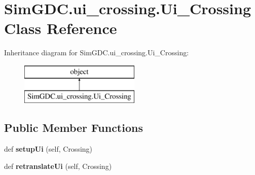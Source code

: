 \hypertarget{class_sim_g_d_c_1_1ui__crossing_1_1_ui___crossing}{}\section{Sim\+G\+D\+C.\+ui\+\_\+crossing.\+Ui\+\_\+\+Crossing Class Reference}
\label{class_sim_g_d_c_1_1ui__crossing_1_1_ui___crossing}
Inheritance diagram for Sim\+G\+D\+C.\+ui\+\_\+crossing.\+Ui\+\_\+\+Crossing\+:\begin{figure}[H]
\begin{center}
\leavevmode
\includegraphics[height=2.000000cm]{class_sim_g_d_c_1_1ui__crossing_1_1_ui___crossing}
\end{center}
\end{figure}
\subsection*{Public Member Functions}
\begin{DoxyCompactItemize}
\item 
\hypertarget{class_sim_g_d_c_1_1ui__crossing_1_1_ui___crossing_afd727a98bc7121d98cd08a546063da6e}{}def {\bfseries setup\+Ui} (self, Crossing)\label{class_sim_g_d_c_1_1ui__crossing_1_1_ui___crossing_afd727a98bc7121d98cd08a546063da6e}

\item 
\hypertarget{class_sim_g_d_c_1_1ui__crossing_1_1_ui___crossing_abe5aad659a739dcfeb3c33af37e51f0b}{}def {\bfseries retranslate\+Ui} (self, Crossing)\label{class_sim_g_d_c_1_1ui__crossing_1_1_ui___crossing_abe5aad659a739dcfeb3c33af37e51f0b}

\end{DoxyCompactItemize}
